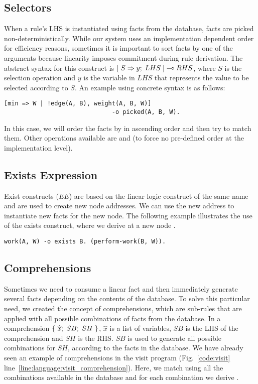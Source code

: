 \subsection{Selectors}

When a rule's LHS is instantiated using facts from the database, facts are picked
non-deterministically. While our system uses an implementation dependent order
for efficiency reasons, sometimes it is important to sort facts by one of the
arguments because linearity imposes commitment during rule derivation. The
abstract syntax for this construct is $[\; S \Rightarrow y; \; LHS \;] \multimap RHS$, where $S$ is
the selection operation and $y$ is the variable in $LHS$ that represents
the value to be selected according to $S$. An example using concrete syntax is
as follows:

\begin{Verbatim}[fontsize=\codesize]
[min => W | !edge(A, B), weight(A, B, W)]
                              -o picked(A, B, W).
\end{Verbatim}

In this case, we will order the  facts by  in ascending
order and then try to match them. Other operations available are 
and  (to force no pre-defined order at the implementation level).

\subsection{Exists Expression}

Exist constructs ($EE$) are based on the linear logic construct of the same name
and are used to create new node addresses. We can use the new address to
instantiate new facts for the new node.  The following example illustrates the
use of the exists construct, where we derive  at a new node
.

\begin{Verbatim}[fontsize=\codesize]
   work(A, W) -o exists B. (perform-work(B, W)).
\end{Verbatim}

\subsection{Comprehensions}

Sometimes we need to consume a linear fact and then immediately generate several
facts depending on the contents of the database. To solve this particular need,
we created the concept of comprehensions, which are sub-rules that are applied
with all possible combinations of facts from the database. In a comprehension
$\{ \; \widehat{x}; \; SB; \; SH \; \}$, $\widehat{x}$ is a list of variables,
$SB$ is the LHS of the comprehension and $SH$ is the RHS. $SB$ is used to
generate all possible combinations for $SH$, according to the facts in the
database.  We have already seen an example of comprehensions in the visit
program (Fig.~\ref{code:visit} line~\ref{line:language:visit_comprehension}).
Here, we match  using all the combinations available in the
database and for each combination we derive .

